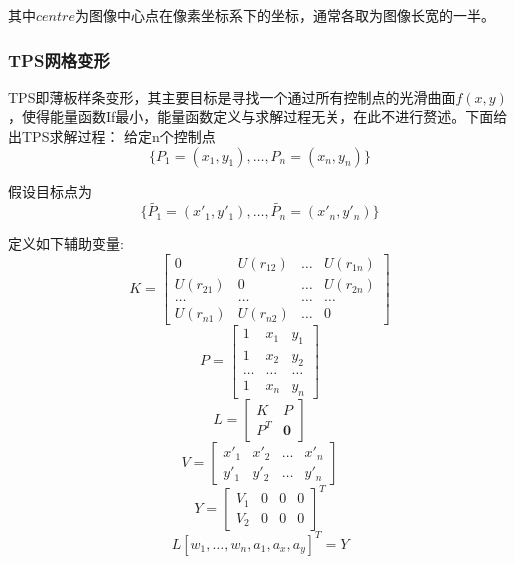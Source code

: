 \documentclass[UTF8]{ctexart}
\begin{document}
其中$centre$为图像中心点在像素坐标系下的坐标，通常各取为图像长宽的一半。

\subsubsection{TPS网格变形}
TPS即薄板样条变形，其主要目标是寻找一个通过所有控制点的光滑曲面$f(x,y)$，使得能量函数If最小，能量函数定义与求解过程无关，在此不进行赘述。下面给出TPS求解过程：
给定n个控制点$$\{P_1=(x_1,y_1),\dots,P_n=(x_n,y_n)\}$$

假设目标点为$$\{ \tilde{P_1}=(x'_1,y'_1),\dots,\tilde{P_n}=(x'_n,y'_n)\}$$

定义如下辅助变量:
\begin{equation}
    K=\left[
    \begin{matrix}
        0 & U(r_{12}) & \dots & U(r_{1n})\\
        U(r_{21}) & 0 & \dots & U(r_{2n})\\
        \dots & \dots & \dots & \dots \\
        U(r_{n1}) & U(r_{n2}) & \dots & 0
    \end{matrix}    
    \right]
\end{equation}
\begin{equation}
    P=\left[
    \begin{matrix}
        1 & x_1 & y_1 \\
        1 & x_2 & y_2 \\
        \dots & \dots & \dots \\
        1 & x_n & y_n
    \end{matrix}    
    \right]
\end{equation}
\begin{equation}
    L=\left[
    \begin{matrix}
        K & P\\
        P^T & \textbf{0}
    \end{matrix}    
    \right]
\end{equation}
\begin{equation}
    V=\left[
    \begin{matrix}
        x'_1 & x'_2 & \dots & x'_n\\
        y'_1 & y'_2 & \dots & y'_n
    \end{matrix}    
    \right]
\end{equation}
\begin{equation}
    Y=\left[
    \begin{matrix}
        V_1 & 0 & 0 & 0\\
        V_2 & 0 & 0 & 0
    \end{matrix}
    \right]^T
\end{equation}
\begin{equation}
    L\left[
    w_1,\dots,w_n,a_1,a_x,a_y    
    \right]^T = Y
\end{equation}
\end{document}
